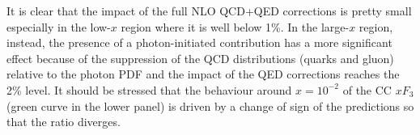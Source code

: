 
It is clear that the impact of the full NLO QCD+QED corrections is
pretty small especially in the low-$x$ region where it is well below
1\%. In the large-$x$ region, instead, the presence of a
photon-initiated contribution has a more significant effect because of
the suppression of the QCD distributions (quarks and gluon) relative
to the photon PDF and the impact of the QED corrections reaches the
2\% level. It should be stressed that the behaviour around $x=10^{-2}$
of the CC $xF_3$ (green curve in the lower panel) is driven by a
change of sign of the predictions so that the ratio diverges.
